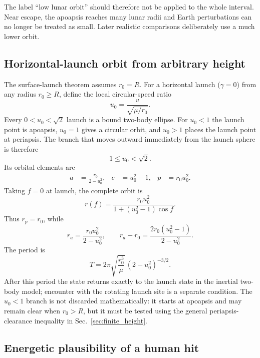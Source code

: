 The label ``low lunar orbit'' should therefore not be applied to the whole interval. Near escape, the apoapsis reaches many lunar radii and Earth perturbations can no longer be treated as small. Later realistic comparisons deliberately use a much lower orbit.

\subsection{Horizontal-launch orbit from arbitrary height}

The surface-launch theorem assumes \(r_0=R\). For a horizontal launch
(\(\gamma=0\)) from any radius \(r_0\geq R\), define the local circular-speed
ratio
\begin{equation}
 u_0=\frac{v}{\sqrt{\mu/r_0}}.
 \label{eq:local_speed_ratio}
\end{equation}
Every \(0<u_0<\sqrt2\) launch is a bound two-body ellipse. For \(u_0<1\)
the launch point is apoapsis, \(u_0=1\) gives a circular orbit, and \(u_0>1\)
places the launch point at periapsis. The branch that moves outward
immediately from the launch sphere is therefore
\begin{equation}
 1\leq u_0<\sqrt2.
\end{equation}
Its orbital elements are
\begin{align}
 a&=\frac{r_0}{2-u_0^2},&
 e&=u_0^2-1,&
 p&=r_0u_0^2.
 \label{eq:gen_elements}
\end{align}
Taking \(f=0\) at launch, the complete orbit is
\begin{equation}
 r(f)=\frac{r_0u_0^2}
 {1+(u_0^2-1)\cos f}.
 \label{eq:gen_polar}
\end{equation}
Thus \(r_p=r_0\), while
\begin{equation}
 r_a=\frac{r_0u_0^2}{2-u_0^2},\qquad
 r_a-r_0=
 \frac{2r_0(u_0^2-1)}{2-u_0^2}.
 \label{eq:gen_apoapsis}
\end{equation}
The period is
\begin{equation}
 T=2\pi\sqrt{\frac{r_0^3}{\mu}}\,
 (2-u_0^2)^{-3/2}.
 \label{eq:gen_T}
\end{equation}
After this period the state returns exactly to the launch state in the
inertial two-body model; encounter with the rotating launch site is a
separate condition. The \(u_0<1\) branch is not discarded mathematically:
it starts at apoapsis and may remain clear when \(r_0>R\), but it must be
tested using the general periapsis-clearance inequality in
Sec.~\ref{sec:finite_height}.

\subsection{Energetic plausibility of a human hit}

